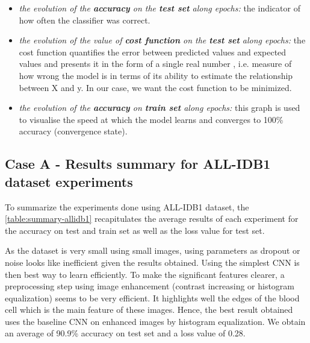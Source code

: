 \documentclass[11pt, openany]{report}
\theoremstyle{plain}
\theoremstyle{definition}
\theoremstyle{remark}
\begin{document}
\begin{itemize}
\item \textit{the evolution of the \textbf{accuracy} on the \textbf{test set} along epochs:} the indicator of how often the classifier was correct. 
\item \textit{the evolution of the value of \textbf{cost function} on the \textbf{test set} along epochs:} the cost function quantifies the error between predicted values and expected values and presents it in the form of a single real number \cite{TDS-CostFunction}, i.e. measure of how wrong the model is in terms of its ability to estimate the relationship between X and y. In our case, we want the cost function to be minimized.  
\item \textit{the evolution of the \textbf{accuracy} on \textbf{train set} along epochs:} this graph is used to visualise the speed at which the model learns and converges to 100\% accuracy (convergence state). 
\end{itemize}

\newpage
\subsection{Case A - Results summary for ALL-IDB1 dataset experiments}


\vspace{0.5cm}

To summarize the experiments done using ALL-IDB1 dataset, the \autoref{table:summary-allidb1} recapitulates the average results of each experiment for the accuracy on test and train set as well as the loss value for test set. 

As the dataset is very small using small images, using parameters as dropout or noise looks like inefficient given the results obtained. Using the simplest CNN is then best way to learn efficiently. To make the significant features clearer, a preprocessing step using image enhancement (contrast increasing or histogram equalization) seems to be very efficient. It highlights well the edges of the blood cell which is the main feature of these images. Hence, the best result obtained uses the baseline CNN on enhanced images by histogram equalization. We obtain an average of 90.9\% accuracy on test set and a loss value of 0.28. 
\end{document}
